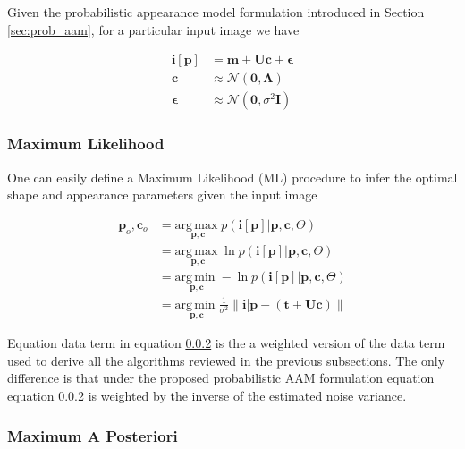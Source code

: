 Given the probabilistic appearance model formulation introduced in Section \ref{sec:prob_aam}, for a particular input image we have

\begin{align}
\mathbf{i}[\mathbf{p}] & = \mathbf{m} + \mathbf{U} \mathbf{c} + \boldsymbol{\epsilon}
\\
\mathbf{c} &\approx \mathcal{N}(\mathbf{0}, \boldsymbol{\Lambda})
\\
\boldsymbol{\epsilon} & \approx \mathcal{N}(\mathbf{0}, \sigma^2 \mathbf{I})
\end{align}


\subsubsection{Maximum Likelihood}

One can easily define a Maximum Likelihood (ML) procedure to infer the optimal shape and appearance parameters given the input image

\begin{align}
\mathbf{p}_o, \mathbf{c}_o & = \underset{\mathbf{p}, \mathbf{c}}{\mathrm{arg\,max\;}} 
p(\mathbf{i}[\mathbf{p}] | \mathbf{p}, \mathbf{c}, \Theta)
\\
& = \underset{\mathbf{p}, \mathbf{c}}{\mathrm{arg\,max\;}} 
\ln p(\mathbf{i}[\mathbf{p}] | \mathbf{p}, \mathbf{c}, \Theta)
\\
& = \underset{\mathbf{p}, \mathbf{c}}{\mathrm{arg\,min\;}} 
- \ln p(\mathbf{i}[\mathbf{p}] | \mathbf{p}, \mathbf{c}, \Theta)
\\
& = \underset{\mathbf{p}, \mathbf{c}}{\mathrm{arg\,min\;}} 
\frac{1}{\sigma^2} \left\| \mathbf{i}[\mathbf{p} - \left( \mathbf{t} + \mathbf{U}\mathbf{c} \right) \right\|
\end{align}

Equation data term in equation \ref{} is the a weighted version of the data term used to derive all the algorithms reviewed in the previous subsections. The only difference is that under the proposed probabilistic AAM formulation equation equation \ref{} is weighted by the inverse of the estimated noise variance.

\subsubsection{Maximum A Posteriori}

